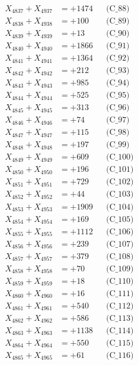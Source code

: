 \documentclass[a4paper,10pt]{article}
\begin{document}
{\begin{align}
X_{4837} + X_{4937} &= +1474 && \text{(C\_88)} \\
X_{4838} + X_{4938} &= +100 && \text{(C\_89)} \\
X_{4839} + X_{4939} &= +13 && \text{(C\_90)} \\
\allowbreak
X_{4840} + X_{4940} &= +1866 && \text{(C\_91)} \\
X_{4841} + X_{4941} &= +1364 && \text{(C\_92)} \\
X_{4842} + X_{4942} &= +212 && \text{(C\_93)} \\
X_{4843} + X_{4943} &= +985 && \text{(C\_94)} \\
X_{4844} + X_{4944} &= +525 && \text{(C\_95)} \\
\allowbreak
X_{4845} + X_{4945} &= +313 && \text{(C\_96)} \\
X_{4846} + X_{4946} &= +74 && \text{(C\_97)} \\
X_{4847} + X_{4947} &= +115 && \text{(C\_98)} \\
X_{4848} + X_{4948} &= +197 && \text{(C\_99)} \\
X_{4849} + X_{4949} &= +609 && \text{(C\_100)} \\
\allowbreak
X_{4850} + X_{4950} &= +196 && \text{(C\_101)} \\
X_{4851} + X_{4951} &= +729 && \text{(C\_102)} \\
X_{4852} + X_{4952} &= +44 && \text{(C\_103)} \\
X_{4853} + X_{4953} &= +1909 && \text{(C\_104)} \\
X_{4854} + X_{4954} &= +169 && \text{(C\_105)} \\
\allowbreak
X_{4855} + X_{4955} &= +1112 && \text{(C\_106)} \\
X_{4856} + X_{4956} &= +239 && \text{(C\_107)} \\
X_{4857} + X_{4957} &= +379 && \text{(C\_108)} \\
X_{4858} + X_{4958} &= +70 && \text{(C\_109)} \\
X_{4859} + X_{4959} &= +18 && \text{(C\_110)} \\
\allowbreak
X_{4860} + X_{4960} &= +16 && \text{(C\_111)} \\
X_{4861} + X_{4961} &= +540 && \text{(C\_112)} \\
X_{4862} + X_{4962} &= +586 && \text{(C\_113)} \\
X_{4863} + X_{4963} &= +1138 && \text{(C\_114)} \\
X_{4864} + X_{4964} &= +550 && \text{(C\_115)} \\
\allowbreak
X_{4865} + X_{4965} &= +61 && \text{(C\_116)} \\

\end{align}}
\end{document}
